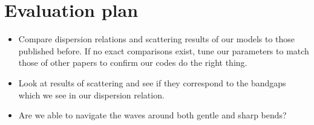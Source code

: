 \chapter{Evaluation plan}

\begin{itemize}
  \item Compare dispersion relations and scattering results of our models to
        those published before. If no exact comparisons exist, tune our
        parameters to match those of other papers to confirm our codes do the
        right thing.
  \item Look at results of scattering and see if they correspond to the
        bandgaps which we see in our dispersion relation.
  \item Are we able to navigate the waves around both gentle and sharp bends?
\end{itemize}
